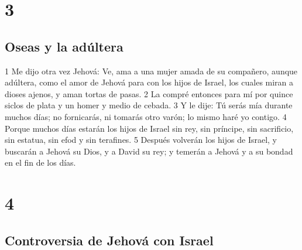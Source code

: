 \chapter{3}

\section*{Oseas y la adúltera}

1 Me dijo otra vez Jehová: Ve, ama a una mujer amada de su compañero, aunque adúltera, como el amor de Jehová para con los hijos de Israel, los cuales miran a dioses ajenos, y aman tortas de pasas.
2 La compré entonces para mí por quince siclos de plata y un homer y medio de cebada.
3 Y le dije: Tú serás mía durante muchos días; no fornicarás, ni tomarás otro varón; lo mismo haré yo contigo. 
4 Porque muchos días estarán los hijos de Israel sin rey, sin príncipe, sin sacrificio, sin estatua, sin efod y sin terafines.
5 Después volverán los hijos de Israel, y buscarán a Jehová su Dios, y a David su rey; y temerán a Jehová y a su bondad en el fin de los días.

\chapter{4}

\section*{Controversia de Jehová con Israel}

